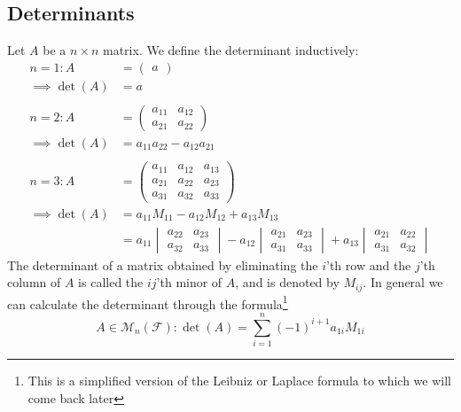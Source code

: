 \subsection{Determinants}\label{subsec-determinants}

\begin{definition}\label{def-inductive-determinant}
	Let $A$ be a $n \times n$ matrix. We define the determinant inductively:
	\begin{align}
		\boxed{n=1}:A    & =\begin{pmatrix}
			a
		\end{pmatrix}\nonumber                                                              \\
		\implies \det(A) & =a                                                                                               \\\nonumber\\
		\boxed{n=2}:A    & =\begin{pmatrix}
			a_{11} & a_{12} \\
			a_{21} & a_{22}
		\end{pmatrix}\nonumber                                                              \\
		\implies \det(A) & =a_{11}a_{22}-a_{12}a_{21}                                                                       \\\nonumber\\
		\boxed{n=3}:A    & =\begin{pmatrix}
			a_{11} & a_{12} & a_{13} \\
			a_{21} & a_{22} & a_{23} \\
			a_{31} & a_{32} & a_{33}
		\end{pmatrix}\nonumber                                                              \\
		\implies \det(A) & =a_{11}M_{11}-a_{12}M_{12}+a_{13}M_{13}\nonumber                                                 \\
		                 & =a_{11}\begin{vmatrix}
			a_{22} & a_{23} \\
			a_{32} & a_{33}
		\end{vmatrix}-a_{12}\begin{vmatrix}
			a_{21} & a_{23} \\
			a_{31} & a_{33}
		\end{vmatrix}+a_{13}\begin{vmatrix}
			a_{21} & a_{22} \\
			a_{31} & a_{32}
		\end{vmatrix}
	\end{align}
	The determinant of a matrix obtained by eliminating the $i$'th row and the
	$j$'th column of $A$ is called the $ij$'th minor of $A$, and is denoted by $M_{ij}$.
	In general we can calculate the determinant through the formula\footnote{This
		is a simplified version of the Leibniz or Laplace formula to which we will come
		back later}
	\begin{equation}
		\boxed{A\in\mathcal{M}_n(\mathcal{F})}:\det(A) = \sum_{i=1}^n (-1)^{i+1} a_{1i}M_{1i}
	\end{equation}
\end{definition}

